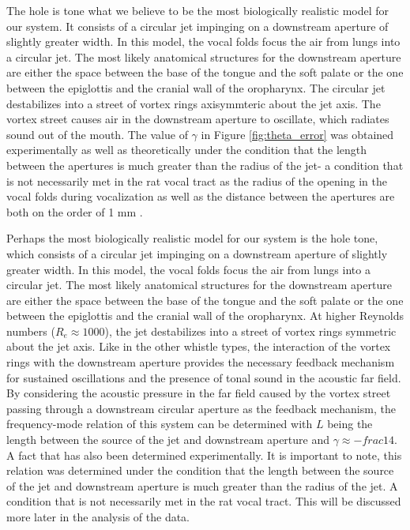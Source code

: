 The hole is tone what we believe to be the most biologically realistic model for our system. It consists of a circular jet impinging on a downstream aperture of slightly greater width. In this model, the vocal folds focus the air from lungs into a circular jet. The most likely anatomical structures for the downstream aperture are either the space between the base of the tongue and the soft palate or the one between the epiglottis and the cranial wall of the oropharynx. The circular jet destabilizes into a street of vortex rings axisymmteric about the jet axis. The vortex street causes air in the downstream aperture to oscillate, which radiates sound out of the mouth. The value of $\gamma$ in Figure \ref{fig:theta_error} was obtained experimentally as well as theoretically under the condition that the length between the apertures is much greater than the radius of the jet- a condition that is not necessarily met in the rat vocal tract as the radius of the opening in the vocal folds during vocalization as well as the distance between the apertures are both on the order of 1 mm \cite{Brudzynski2010,Chanaud1965,}.

Perhaps the most biologically realistic model for our system is the hole tone, which consists of a circular jet impinging on a downstream aperture of slightly greater width. In this model, the vocal folds focus the air from lungs into a circular jet. The most likely anatomical structures for the downstream aperture are either the space between the base of the tongue and the soft palate or the one between the epiglottis and the cranial wall of the oropharynx. At higher Reynolds numbers ($R_e\approx1000$), the jet destabilizes into a street of vortex rings symmetric about the jet axis. Like in the other whistle types, the interaction of the vortex rings with the downstream aperture provides the necessary feedback mechanism for sustained oscillations and the presence of tonal sound in the acoustic far field. By considering the acoustic pressure in the far field caused by the vortex street passing through a downstream circular aperture as the feedback mechanism, the frequency-mode relation of this system can be determined with $L$ being the length between the source of the jet and downstream aperture and $\gamma\approx-frac{1}{4}$. A fact that has also been determined experimentally. It is important to note, this relation was determined under the condition that the length between the source of the jet and downstream aperture is much greater than the radius of the jet. A condition that is not necessarily met in the rat vocal tract. This will be discussed more later in the analysis of the data.      